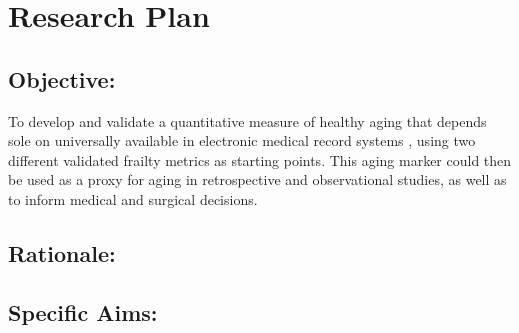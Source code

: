\section{Research Plan }\label{research-plan}


\subsection{Objective:}\label{objective}
  
To develop and validate a quantitative measure of healthy aging that depends sole on universally available in electronic medical record systems ,
using two different validated frailty metrics as starting points. This
aging marker could then be used as a proxy for aging in retrospective
and observational studies, as well as to inform medical and surgical
decisions.


\subsection{Rationale:}\label{rationale}

\subsection{Specific Aims:}\label{specific-aims}
